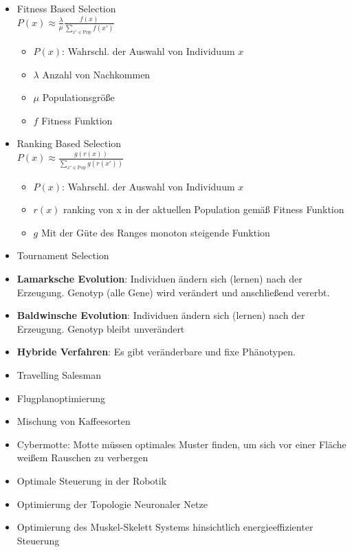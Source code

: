 \begin{itemize}
    \item Fitness Based Selection \\
    $P(x) \approx \frac{\lambda}{\mu}\frac{f(x)}{\sum_{x' \in \text{Pop}} f(x')}$

    \begin{itemize}
        \item $P(x)$: Wahrschl. der Auswahl von Individuum $x$
        \item $\lambda$ Anzahl von Nachkommen
        \item $\mu$ Populationsgröße
        \item $f$ Fitness Funktion
    \end{itemize}
    \item Ranking Based Selection \\
    $P(x) \approx \frac{g(r(x))}{\sum_{x' \in \text{Pop}} g(r(x'))}$

    \begin{itemize}
        \item $P(x)$: Wahrschl. der Auswahl von Individuum $x$
        \item $r(x)$ ranking von x in der aktuellen Population gemäß Fitness
        Funktion
        \item $g$ Mit der Güte des Ranges monoton steigende Funktion
    \end{itemize}
    \item Tournament Selection
\end{itemize}

\begin{itemize}
    \item \textbf{Lamarksche Evolution}: Individuen ändern sich (lernen) nach
    der Erzeugung. Genotyp (alle Gene) wird verändert und anschließend vererbt.
    \item \textbf{Baldwinsche Evolution}: Individuen ändern sich (lernen) nach
    der Erzeugung. Genotyp bleibt unverändert
    \item \textbf{Hybride Verfahren}: Es gibt veränderbare und fixe Phänotypen.
\end{itemize}

\begin{itemize}
    \item Travelling Salesman
    \item Flugplanoptimierung
    \item Mischung von Kaffeesorten
    \item Cybermotte: Motte müssen optimales Muster finden, um sich vor einer
    Fläche weißem Rauschen zu verbergen
    \item Optimale Steuerung in der Robotik
    \item Optimierung der Topologie Neuronaler Netze
    \item Optimierung des Muskel-Skelett Systems hinsichtlich energieeffizienter
Steuerung


\end{itemize}
